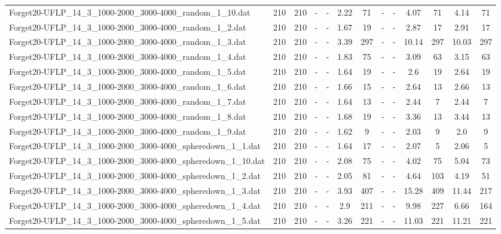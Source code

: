 \begin{table}[!ht]
{\begin{tabular}{lcccccccccccc}
Forget20-UFLP\_14\_3\_1000-2000\_3000-4000\_random\_1\_10.dat & 210 & 210 &  - &  - & 2.22 & 71 &  - &  - & 4.07 & 71 & 4.14 & 71 \\
Forget20-UFLP\_14\_3\_1000-2000\_3000-4000\_random\_1\_2.dat & 210 & 210 &  - &  - & 1.67 & 19 &  - &  - & 2.87 & 17 & 2.91 & 17 \\
Forget20-UFLP\_14\_3\_1000-2000\_3000-4000\_random\_1\_3.dat & 210 & 210 &  - &  - & 3.39 & 297 &  - &  - & 10.14 & 297 & 10.03 & 297 \\
Forget20-UFLP\_14\_3\_1000-2000\_3000-4000\_random\_1\_4.dat & 210 & 210 &  - &  - & 1.83 & 75 &  - &  - & 3.09 & 63 & 3.15 & 63 \\
Forget20-UFLP\_14\_3\_1000-2000\_3000-4000\_random\_1\_5.dat & 210 & 210 &  - &  - & 1.64 & 19 &  - &  - & 2.6 & 19 & 2.64 & 19 \\
Forget20-UFLP\_14\_3\_1000-2000\_3000-4000\_random\_1\_6.dat & 210 & 210 &  - &  - & 1.66 & 15 &  - &  - & 2.64 & 13 & 2.66 & 13 \\
Forget20-UFLP\_14\_3\_1000-2000\_3000-4000\_random\_1\_7.dat & 210 & 210 &  - &  - & 1.64 & 13 &  - &  - & 2.44 & 7 & 2.44 & 7 \\
Forget20-UFLP\_14\_3\_1000-2000\_3000-4000\_random\_1\_8.dat & 210 & 210 &  - &  - & 1.68 & 19 &  - &  - & 3.36 & 13 & 3.44 & 13 \\
Forget20-UFLP\_14\_3\_1000-2000\_3000-4000\_random\_1\_9.dat & 210 & 210 &  - &  - & 1.62 & 9 &  - &  - & 2.03 & 9 & 2.0 & 9 \\
Forget20-UFLP\_14\_3\_1000-2000\_3000-4000\_spheredown\_1\_1.dat & 210 & 210 &  - &  - & 1.64 & 17 &  - &  - & 2.07 & 5 & 2.06 & 5 \\
Forget20-UFLP\_14\_3\_1000-2000\_3000-4000\_spheredown\_1\_10.dat & 210 & 210 &  - &  - & 2.08 & 75 &  - &  - & 4.02 & 75 & 5.04 & 73 \\
Forget20-UFLP\_14\_3\_1000-2000\_3000-4000\_spheredown\_1\_2.dat & 210 & 210 &  - &  - & 2.05 & 81 &  - &  - & 4.64 & 103 & 4.19 & 51 \\
Forget20-UFLP\_14\_3\_1000-2000\_3000-4000\_spheredown\_1\_3.dat & 210 & 210 &  - &  - & 3.93 & 407 &  - &  - & 15.28 & 409 & 11.44 & 217 \\
Forget20-UFLP\_14\_3\_1000-2000\_3000-4000\_spheredown\_1\_4.dat & 210 & 210 &  - &  - & 2.9 & 211 &  - &  - & 9.98 & 227 & 6.66 & 164 \\
Forget20-UFLP\_14\_3\_1000-2000\_3000-4000\_spheredown\_1\_5.dat & 210 & 210 &  - &  - & 3.26 & 221 &  - &  - & 11.03 & 221 & 11.21 & 221 \\

\end{tabular}}
\end{table}
